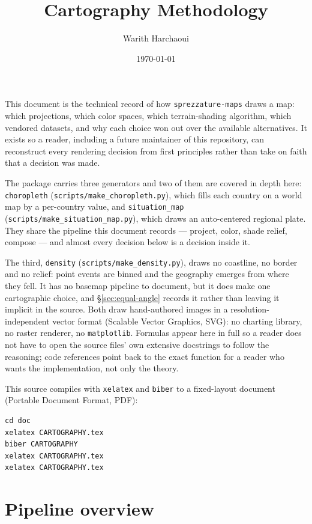 \documentclass[11pt]{article}
\title{\color{CBlue}Cartography Methodology}
\author{Warith Harchaoui}
\date{\today}
\begin{document}
\maketitle

This document is the technical record of how \texttt{sprezzature-maps} draws
a map: which projections, which color spaces, which terrain-shading
algorithm, which vendored datasets, and why each choice won out over the
available alternatives. It exists so a reader, including a future
maintainer of this repository, can reconstruct every rendering decision
from first principles rather than take on faith that a decision was made.

The package carries three generators and two of them are covered in
depth here: \texttt{choropleth} (\texttt{scripts/make\_choropleth.py}),
which fills each country on a world map by a per-country value, and
\texttt{situation\_map} (\texttt{scripts/make\_situation\_map.py}), which draws an
auto-centered regional plate. They share the pipeline this document
records --- project, color, shade relief, compose --- and almost every
decision below is a decision inside it.

The third, \texttt{density} (\texttt{scripts/make\_density.py}), draws no
coastline, no border and no relief: point events are binned and the
geography emerges from where they fell. It has no basemap pipeline to
document, but it does make one cartographic choice, and
\S\ref{sec:equal-angle} records it rather than leaving it implicit in the
source. Both draw hand-authored images in a
resolution-independent vector format (Scalable Vector Graphics, SVG):
no charting library, no raster renderer, no \texttt{matplotlib}. Formulas
appear here in full so a reader does not have to open the source files'
own extensive docstrings to follow the reasoning; code references point
back to the exact function for a reader who wants the implementation, not
only the theory.

This source compiles with \texttt{xelatex} and \texttt{biber} to a fixed-layout
document (Portable Document Format, PDF):

\begin{verbatim}
cd doc
xelatex CARTOGRAPHY.tex
biber CARTOGRAPHY
xelatex CARTOGRAPHY.tex
xelatex CARTOGRAPHY.tex
\end{verbatim}

\tableofcontents

\section{Pipeline overview}
\end{document}

